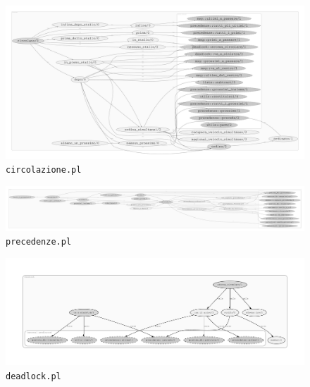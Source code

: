 \begin{figure}
	\includegraphics[width=\textwidth, height=\textheight, keepaspectratio]{diagrams/circolazione}
	\caption{\texttt{circolazione.pl}}
\end{figure}

\begin{figure}
	\includegraphics[width=\textwidth, height=\textheight, keepaspectratio]{diagrams/precedenze}
	\caption{\texttt{precedenze.pl}}
\end{figure}

\begin{figure}
	\includegraphics[width=\textwidth, height=\textheight, keepaspectratio]{diagrams/deadlock}
	\caption{\texttt{deadlock.pl}}
\end{figure}


